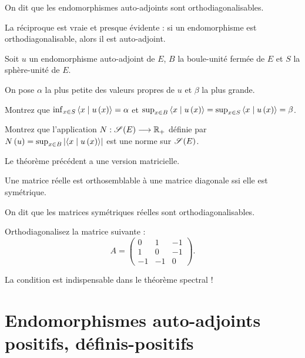 On dit que les endomorphismes auto-adjoints sont orthodiagonalisables.

\begin{rem}
La réciproque est vraie et presque évidente : si un endomorphisme est orthodiagonalisable, alors il est auto-adjoint.
\end{rem}

\begin{exo}
Soit \(u\) un endomorphisme auto-adjoint de \(E\), \(B\) la boule-unité fermée de \(E\) et \(S\) la sphère-unité de \(E\).

On pose \(\alpha\) la plus petite des valeurs propres de \(u\) et \(\beta\) la plus grande.

Montrez que \(\inf_{x\in S}\ps{x}{u\paren{x}}=\alpha\) et \(\sup_{x\in B}\ps{x}{u\paren{x}}=\sup_{x\in S}\ps{x}{u\paren{x}}=\beta\).
\end{exo}

\begin{exo}
Montrez que l'application \(N:\sym{}[E]\to\Rp\) définie par \(N\paren{u}=\sup_{x\in B}\abs{\ps{x}{u\paren{x}}}\) est une norme sur \(\sym{}[E]\).
\end{exo}

Le théorème précédent a une version matricielle.

\begin{theo}
Une matrice réelle est orthosemblable à une matrice diagonale ssi elle est symétrique.
\end{theo}

On dit que les matrices symétriques réelles sont orthodiagonalisables.

\begin{exo}
Orthodiagonalisez la matrice suivante : \[A=\begin{pmatrix}
0 & 1 & -1 \\
1 & 0 & -1 \\
-1 & -1 & 0
\end{pmatrix}.\]
\end{exo}

\begin{rem}
La condition  est indispensable dans le théorème spectral !
\end{rem}

\section{Endomorphismes auto-adjoints positifs, définis-positifs}

